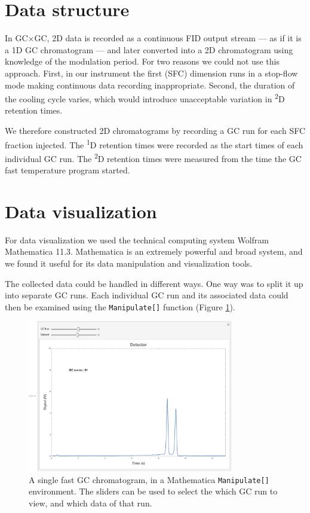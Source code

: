 \section{Data structure}

In GC×GC, 2D data is recorded as a continuous FID output stream --- as if it is
a 1D GC chromatogram --- and later converted into a 2D chromatogram using
knowledge of the modulation period. For two reasons we could not use this
approach. First, in our instrument the first (SFC) dimension runs in a
stop-flow mode making continuous data recording inappropriate. Second, the
duration of the cooling cycle varies, which would introduce unacceptable
variation in \textsuperscript{2}D retention times.

We therefore constructed 2D chromatograms by recording a GC run for each SFC
fraction injected. The \textsuperscript{1}D
retention times were recorded as the start times of each individual GC run.
The \textsuperscript{2}D retention times were measured from
the time the GC fast temperature program started. 

\section{Data visualization}
For data visualization we used the technical computing system Wolfram
Mathematica 11.3\texttrademark{}. Mathematica is an extremely powerful and broad
system, and we found it useful for its data manipulation and visualization
tools.

The collected data could be handled in different ways. One way was to split it
up into separate GC runs. Each individual GC run and its associated data could
then be examined using the \texttt{Manipulate[]} function (Figure
\ref{fig:SingleGC}).

\begin{figure}
	\centering
	\includegraphics[width=0.8\textwidth]{Figures/Manipulate.pdf}
	\decoRule
	
	\caption[A single fast GC chromatogram ]{A single fast GC chromatogram, in a
	Mathematica \texttt{Manipulate[]} environment. The sliders can be used to select
	the which GC run to view, and which data of that run. }
	
	\label{fig:SingleGC}
\end{figure}

